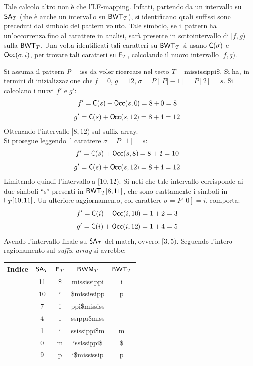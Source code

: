 Tale calcolo altro non è che l'LF-mapping. Infatti, partendo da un
intervallo su $\mbox{\rm {\sf SA}}_T$ (che è anche un intervallo su $\mbox{\rm {\sf BWT}}_T$), si identificano
quali suffissi sono preceduti dal simbolo del pattern voluto. Tale simbolo, se
il 
pattern ha un'occorrenza fino al carattere in analisi, sarà presente in
sottointervallo di $[f,g)$ sulla $\mbox{\rm {\sf BWT}}_T$. Una volta identificati tali caratteri
su $\mbox{\rm {\sf BWT}}_T$ si usano $\mbox{\rm {\sf C}}(\sigma)$ e $\mbox{\rm {\sf Occ}}(\sigma, i)$, per trovare tali
caratteri su $\mbox{\rm {\sf F}}_T$, calcolando il nuovo intervallo $[f,g)$.
\begin{esempio}
  Si assuma il pattern $P=\mbox{iss}$ da voler ricercare nel testo
  $T=\mbox{mississippi\$}$. 
  Si ha, in termini di inizializzazione che $f=0$, $g=12$,
  $\sigma=P[|P|-1]=P[2]=s$. Si calcolano i nuovi $f'$ e $g'$:
  \[f'=\mbox{\rm {\sf C}}(s)+\mbox{\rm {\sf Occ}}(s, 0)=8+0=8\]
  \[g'=\mbox{\rm {\sf C}}(s)+\mbox{\rm {\sf Occ}}(s, 12)=8+4=12\]
  Ottenendo l'intervallo $[8,12)$ sul suffix array.\\
  Si prosegue leggendo il carattere $\sigma=P[1]=s$:
  \[f'=\mbox{\rm {\sf C}}(s)+\mbox{\rm {\sf Occ}}(s, 8)=8+2=10\]
  \[g'=\mbox{\rm {\sf C}}(s)+\mbox{\rm {\sf Occ}}(s, 12)=8+4=12\]
  Limitando quindi l'intervallo a $[10,12)$. Si noti che tale intervallo
  corrisponde ai due simboli ``s'' presenti in $\mbox{\rm {\sf BWT}}_T[8,11]$, che sono
  esattamente i simboli in $\mbox{\rm {\sf F}}_T[10,11]$.
  Un ulteriore aggiornamento, col carattere $\sigma=P[0]=i$, comporta:
  \[f'=\mbox{\rm {\sf C}}(i)+\mbox{\rm {\sf Occ}}(i, 10)=1+2=3\]
  \[g'=\mbox{\rm {\sf C}}(i)+\mbox{\rm {\sf Occ}}(i, 12)=1+4=5\]
  Avendo l'intervallo finale su $\mbox{\rm {\sf SA}}_T$ del match, ovvero: $[3,5)$.
  Seguendo l'intero ragionamento sul \textit{suffix array} si avrebbe:
  \begin{table}[H]
    \centering
    \scriptsize
    \begin{tabular}{c|c|c|c|c} 
      \textbf{Indice} & $\mbox{\rm {\sf SA}}_T$ & $\mbox{\rm {\sf F}}_T$ & $\mbox{\rm {\sf BWM}}_T$
      & $\mbox{\rm {\sf BWT}}_T$\\ 
      \hline
      {\color{nordred}{0}} & 11 & \$ & {\color{nordred}{\$}}mississippi & i\\
      {\color{nordred}{1}} & 10 & i & {\color{nordred}{i}}\$mississipp & p\\
      {\color{nordred}{2}} & 7 & i & {\color{nordred}{i}}ppi\$mississ
      & {\color{nordgreen}{s}}\\
      {\color{nordred}{3}} & 4 & i & {\color{nordred}{i}}ssippi\$miss
      & {\color{nordgreen}{s}}\\
      {\color{nordred}{4}} & 1 & i & {\color{nordred}{i}}ssissippi\$m & m\\
      {\color{nordred}{5}} & 0 & m & {\color{nordred}{m}}ississippi\$ & \$\\
      {\color{nordred}{6}} & 9 & p & {\color{nordred}{p}}i\$mississip & p\\

\end{tabular}
\end{table}
\end{esempio}

